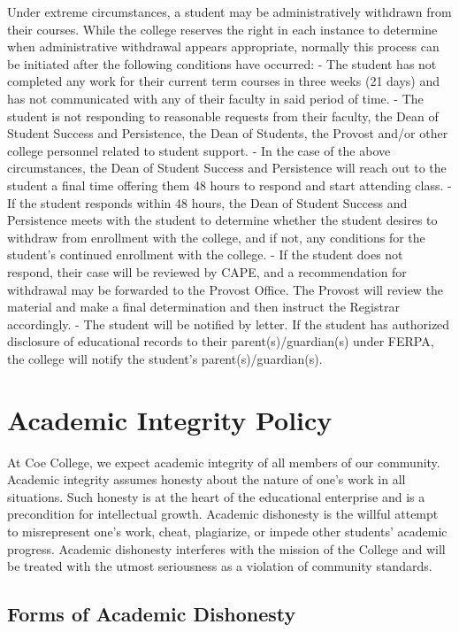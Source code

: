 \documentclass[
  letterpaper,
]{scrbook}
\begin{document}
Under extreme circumstances, a student may be administratively withdrawn
from their courses. While the college reserves the right in each
instance to determine when administrative withdrawal appears
appropriate, normally this process can be initiated after the following
conditions have occurred: - The student has not completed any work for
their current term courses in three weeks (21 days) and has not
communicated with any of their faculty in said period of time. - The
student is not responding to reasonable requests from their faculty, the
Dean of Student Success and Persistence, the Dean of Students, the
Provost and/or other college personnel related to student support. - In
the case of the above circumstances, the Dean of Student Success and
Persistence will reach out to the student a final time offering them 48
hours to respond and start attending class. - If the student responds
within 48 hours, the Dean of Student Success and Persistence meets with
the student to determine whether the student desires to withdraw from
enrollment with the college, and if not, any conditions for the
student's continued enrollment with the college. - If the student does
not respond, their case will be reviewed by CAPE, and a recommendation
for withdrawal may be forwarded to the Provost Office. The Provost will
review the material and make a final determination and then instruct the
Registrar accordingly. - The student will be notified by letter. If the
student has authorized disclosure of educational records to their
parent(s)/guardian(s) under FERPA, the college will notify the student's
parent(s)/guardian(s).

\section{Academic Integrity Policy}\label{academic-integrity-policy}

At Coe College, we expect academic integrity of all members of our
community. Academic integrity assumes honesty about the nature of one's
work in all situations. Such honesty is at the heart of the educational
enterprise and is a precondition for intellectual growth. Academic
dishonesty is the willful attempt to misrepresent one's work, cheat,
plagiarize, or impede other students' academic progress. Academic
dishonesty interferes with the mission of the College and will be
treated with the utmost seriousness as a violation of community
standards.

\subsection{Forms of Academic
Dishonesty}\label{forms-of-academic-dishonesty}
\end{document}
